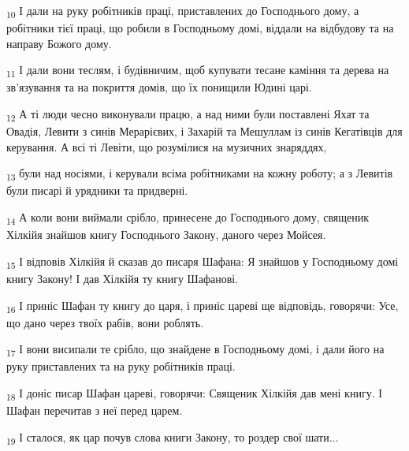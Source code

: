 \begin{tcolorbox}
\textsubscript{10} І дали на руку робітників праці, приставлених до Господнього дому, а робітники тієї праці, що робили в Господньому домі, віддали на відбудову та на направу Божого дому.
\end{tcolorbox}
\begin{tcolorbox}
\textsubscript{11} І дали вони теслям, і будівничим, щоб купувати тесане каміння та дерева на зв'язування та на покриття домів, що їх понищили Юдині царі.
\end{tcolorbox}
\begin{tcolorbox}
\textsubscript{12} А ті люди чесно виконували працю, а над ними були поставлені Яхат та Овадія, Левити з синів Мерарієвих, і Захарій та Мешуллам із синів Кегатівців для керування. А всі ті Левіти, що розумілися на музичних знаряддях,
\end{tcolorbox}
\begin{tcolorbox}
\textsubscript{13} були над носіями, і керували всіма робітниками на кожну роботу; а з Левитів були писарі й урядники та придверні.
\end{tcolorbox}
\begin{tcolorbox}
\textsubscript{14} А коли вони виймали срібло, принесене до Господнього дому, священик Хілкійя знайшов книгу Господнього Закону, даного через Мойсея.
\end{tcolorbox}
\begin{tcolorbox}
\textsubscript{15} І відповів Хілкійя й сказав до писаря Шафана: Я знайшов у Господньому домі книгу Закону! І дав Хілкійя ту книгу Шафанові.
\end{tcolorbox}
\begin{tcolorbox}
\textsubscript{16} І приніс Шафан ту книгу до царя, і приніс цареві ще відповідь, говорячи: Усе, що дано через твоїх рабів, вони роблять.
\end{tcolorbox}
\begin{tcolorbox}
\textsubscript{17} І вони висипали те срібло, що знайдене в Господньому домі, і дали його на руку приставлених та на руку робітників праці.
\end{tcolorbox}
\begin{tcolorbox}
\textsubscript{18} І доніс писар Шафан цареві, говорячи: Священик Хілкійя дав мені книгу. І Шафан перечитав з неї перед царем.
\end{tcolorbox}
\begin{tcolorbox}
\textsubscript{19} І сталося, як цар почув слова книги Закону, то роздер свої шати...
\end{tcolorbox}
